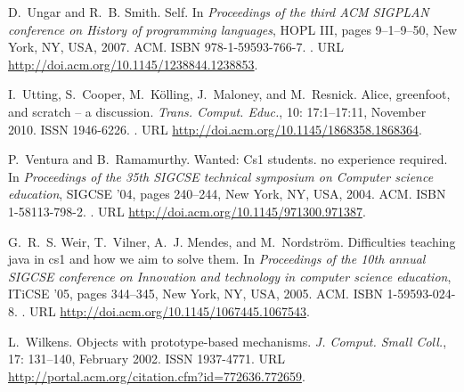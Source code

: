 \documentclass{sigplanconf}
\begin{document}
\begin{thebibliography}{}
D.~Ungar and R.~B. Smith.
\newblock Self.
\newblock In \emph{Proceedings of the third ACM SIGPLAN conference on History
  of programming languages}, HOPL III, pages 9--1--9--50, New York, NY, USA,
  2007. ACM.
\newblock ISBN 978-1-59593-766-7.
\newblock {}.
\newblock URL \url{http://doi.acm.org/10.1145/1238844.1238853}.

I.~Utting, S.~Cooper, M.~K\"{o}lling, J.~Maloney, and M.~Resnick.
\newblock Alice, greenfoot, and scratch -- a discussion.
\newblock \emph{Trans. Comput. Educ.}, 10: 17:1--17:11, November 2010.
\newblock ISSN 1946-6226.
\newblock {}.
\newblock URL \url{http://doi.acm.org/10.1145/1868358.1868364}.

P.~Ventura and B.~Ramamurthy.
\newblock Wanted: Cs1 students. no experience required.
\newblock In \emph{Proceedings of the 35th SIGCSE technical symposium on
  Computer science education}, SIGCSE '04, pages 240--244, New York, NY, USA,
  2004. ACM.
\newblock ISBN 1-58113-798-2.
\newblock {}.
\newblock URL \url{http://doi.acm.org/10.1145/971300.971387}.

G.~R.~S. Weir, T.~Vilner, A.~J. Mendes, and M.~Nordstr\"{o}m.
\newblock Difficulties teaching java in cs1 and how we aim to solve them.
\newblock In \emph{Proceedings of the 10th annual SIGCSE conference on
  Innovation and technology in computer science education}, ITiCSE '05, pages
  344--345, New York, NY, USA, 2005. ACM.
\newblock ISBN 1-59593-024-8.
\newblock {}.
\newblock URL \url{http://doi.acm.org/10.1145/1067445.1067543}.

L.~Wilkens.
\newblock Objects with prototype-based mechanisms.
\newblock \emph{J. Comput. Small Coll.}, 17: 131--140, February 2002.
\newblock ISSN 1937-4771.
\newblock URL \url{http://portal.acm.org/citation.cfm?id=772636.772659}.

\end{thebibliography}
\end{document}
